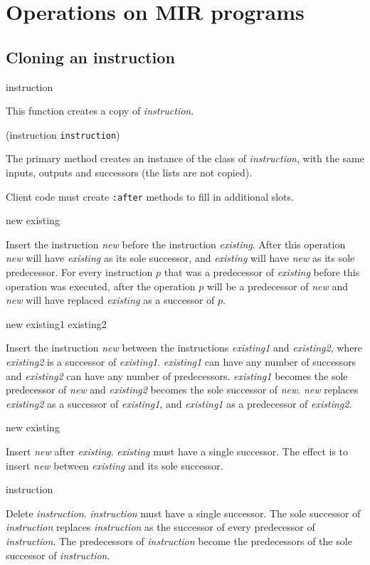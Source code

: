 \section{Operations on MIR programs}

\subsection{Cloning an instruction}

 {instruction}

This function creates a copy of \textit{instruction}.

 {(instruction {\tt instruction})}

The primary method creates an instance of the class of
\textit{instruction}, with the same inputs, outputs and successors
(the lists are not copied). 

Client code must create \texttt{:after} methods to fill in additional
slots. 

 {new existing}

Insert the instruction \textit{new} before the instruction
\textit{existing}.  After this operation \textit{new} will have
\textit{existing} as its sole successor, and \textit{existing} will
have \textit{new} as its sole predecessor.  For every instruction $p$
that was a predecessor of \textit{existing} before this operation was
executed, after the operation $p$ will be a predecessor of
\textit{new} and \textit{new} will have replaced \textit{existing} as
a successor of $p$.

 {new existing1 existing2}

Insert the instruction \textit{new} between the instructions
\textit{existing1} and \textit{existing2}, where \textit{existing2} is
a successor of \textit{existing1}.  \textit{existing1} can have any
number of successors and \textit{existing2} can have any number of
predecessors.  \textit{existing1} becomes the sole predecessor of
\textit{new} and \textit{existing2} becomes the sole successor of
\textit{new}.  \textit{new} replaces \textit{existing2} as a successor
of \textit{existing1}, and \textit{existing1} as a predecessor of
\textit{existing2}.

 {new existing}

Insert \textit{new} after \textit{existing}.  \textit{existing} must
have a single successor.  The effect is to insert \textit{new} between
\textit{existing} and its sole successor.

 {instruction}

Delete \textit{instruction}.  \textit{instruction} must have a single
successor.  The sole successor of \textit{instruction} replaces
\textit{instruction} as the successor of every predecessor of
\textit{instruction}.  The predecessors of \textit{instruction} become
the predecessors of the sole successor of \textit{instruction}.

